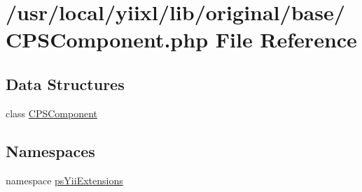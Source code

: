\hypertarget{CPSComponent_8php}{
\section{/usr/local/yiixl/lib/original/base/CPSComponent.php File Reference}
\label{CPSComponent_8php}
}
\subsection*{Data Structures}
\begin{DoxyCompactItemize}
\item 
class \hyperlink{classCPSComponent}{CPSComponent}
\end{DoxyCompactItemize}
\subsection*{Namespaces}
\begin{DoxyCompactItemize}
\item 
namespace \hyperlink{namespacepsYiiExtensions}{psYiiExtensions}
\end{DoxyCompactItemize}
